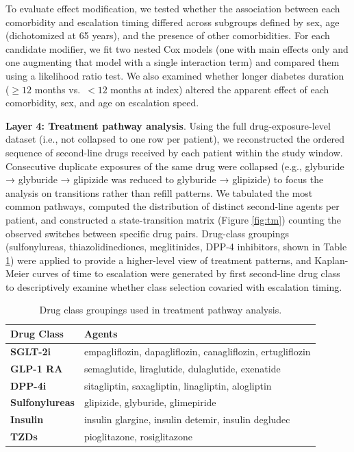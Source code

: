 \documentclass[twoside,11pt]{article}
\begin{document}
To evaluate effect modification, we tested whether the association between each comorbidity and escalation timing differed across subgroups defined by sex, age (dichotomized at 65 years), and the presence of other comorbidities. For each candidate modifier, we fit two nested Cox models (one with main effects only and one augmenting that model with a single interaction term) and compared them using a likelihood ratio test. We also examined whether longer diabetes duration ($\geq 12$ months vs.\ $<12$ months at index) altered the apparent effect of each comorbidity, sex, and age on escalation speed.

\textbf{Layer 4: Treatment pathway analysis}. Using the full drug-exposure-level dataset (i.e., not collapsed to one row per patient), we reconstructed the ordered sequence of second-line drugs received by each patient within the study window. Consecutive duplicate exposures of the same drug were collapsed (e.g., glyburide → glyburide → glipizide was reduced to glyburide → glipizide) to focus the analysis on transitions rather than refill patterns. We tabulated the most common pathways, computed the distribution of distinct second-line agents per patient, and constructed a state-transition matrix (Figure \ref{fig:tm}) counting the observed switches between specific drug pairs. Drug-class groupings (sulfonylureas, thiazolidinediones, meglitinides, DPP-4 inhibitors, shown in Table \ref{tab:drug_classes}) were applied to provide a higher-level view of treatment patterns, and Kaplan-Meier curves of time to escalation were generated by first second-line drug class to descriptively examine whether class selection covaried with escalation timing.

\begin{table}[h]
  \centering
  \begin{tabular}{ll}
    \textbf{Drug Class}    & \textbf{Agents}                                            \\ \hline
    \textbf{SGLT-2i}       & empagliflozin, dapagliflozin, canagliflozin, ertugliflozin \\
    \textbf{GLP-1 RA}      & semaglutide, liraglutide, dulaglutide, exenatide           \\
    \textbf{DPP-4i}        & sitagliptin, saxagliptin, linagliptin, alogliptin          \\
    \textbf{Sulfonylureas} & glipizide, glyburide, glimepiride                          \\
    \textbf{Insulin}       & insulin glargine, insulin detemir, insulin degludec        \\
    \textbf{TZDs}          & pioglitazone, rosiglitazone                                \\
  \end{tabular}
  \caption{Drug class groupings used in treatment pathway analysis.}
  \label{tab:drug_classes}
\end{table}
\end{document}
